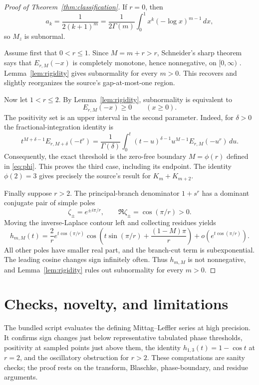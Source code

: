 \documentclass[11pt]{article}
\begin{document}
\begin{proof}[Proof of Theorem~\ref{thm:classification}]
If $r=0$, then
\[
 a_k=\frac{1}{2(k+1)^m}
 =\frac1{2\Gamma(m)}\int_0^1x^k(-\log x)^{m-1}\,dx,
\]
so $M_z$ is subnormal.

Assume first that $0<r\leq1$.  Since $M=m+r>r$, Schneider's sharp theorem
says that $E_{r,M}(-x)$ is completely monotone, hence nonnegative, on
$[0,\infty)$ \cite{schneider,simon}.  Lemma~\ref{lem:rigidity} gives
subnormality for every $m>0$.  This recovers and slightly reorganizes the
source's gap-at-most-one region.

Now let $1<r\leq2$.  By Lemma~\ref{lem:rigidity}, subnormality is equivalent
to
\[
 E_{r,M}(-x)\geq0\qquad(x\geq0).
\]
The positivity set is an upper interval in the second parameter.  Indeed,
for $\delta>0$ the fractional-integration identity is
\[
 t^{M+\delta-1}E_{r,M+\delta}(-t^r)
 =\frac1{\Gamma(\delta)}\int_0^t
 (t-u)^{\delta-1}u^{M-1}E_{r,M}(-u^r)\,du.
\]
Consequently, the exact threshold is the zero-free boundary $M=\phi(r)$
defined in \eqref{eq:phi}.  This proves the third case, including its
endpoint.  The identity $\phi(2)=3$ gives precisely the source's result for
$K_m+K_{m+2}$.

Finally suppose $r>2$.  The principal-branch denominator $1+s^r$ has a
dominant conjugate pair of simple poles
\[
 \zeta_\pm=e^{\pm i\pi/r},\qquad
 \Re\zeta_\pm=\cos(\pi/r)>0.
\]
Moving the inverse-Laplace contour left and collecting residues yields
\begin{equation}\label{eq:asymptotic}
 h_{m,M}(t)=\frac2r e^{t\cos(\pi/r)}
 \cos\!\left(t\sin(\pi/r)+\frac{(1-M)\pi}{r}\right)
 +o\!\left(e^{t\cos(\pi/r)}\right).
\end{equation}
All other poles have smaller real part, and the branch-cut term is
subexponential.  The leading cosine changes sign infinitely often.  Thus
$h_{m,M}$ is not nonnegative, and Lemma~\ref{lem:rigidity} rules out
subnormality for every $m>0$.
\end{proof}

\section{Checks, novelty, and limitations}

The bundled script evaluates the defining Mittag--Leffler series at high
precision.  It confirms sign changes just below representative tabulated
phase thresholds, positivity at sampled points just above them, the identity
$h_{1,3}(t)=1-\cos t$ at $r=2$, and the oscillatory obstruction for $r>2$.
These computations are sanity checks; the proof rests on the transform,
Blaschke, phase-boundary, and residue arguments.
\end{document}
